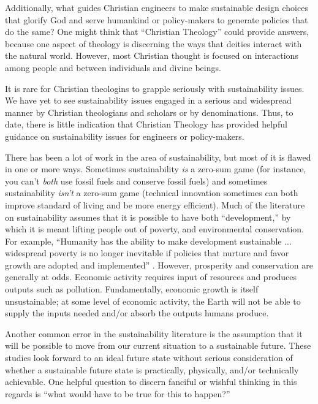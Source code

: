 \documentclass[12pt]{article}
\begin{document}
Additionally, what guides Christian engineers to make sustainable design choices
that glorify God and serve humankind
or policy-makers to generate policies that do the same?
One might think that ``Christian Theology'' could provide answers, because
one aspect of theology is discerning the 
ways that deities interact with the natural world. 
However, most Christian thought is focused on interactions among people 
and between individuals and divine beings.

It is rare for Christian theologins to grapple seriously with 
sustainability issues.
We have yet to see sustainability issues engaged in a serious and widespread manner
by Christian theologians and scholars or by denominations.
Thus, to date, there is little indication that Christian Theology 
has provided helpful guidance on sustainability issues
for engineers or policy-makers.


There has been a lot of work in the area of sustainability, but most of it is flawed in one or more ways.
Sometimes sustainability \emph{is} a zero-sum game 
(for instance, you can't \emph{both} use fossil fuels and conserve fossil fuels)
and sometimes sustainability \emph{isn't} a zero-sum game 
(technical innovation sometimes can both improve standard of living and be more energy efficient).
Much of the literature on sustainability assumes that it is possible to have both ``development,'' by which it is meant lifting people out of poverty,
and environmental conservation. 
For example, ``Humanity has the ability to make development sustainable ... widespread poverty is no
longer inevitable if policies that nurture and favor growth are adopted and implemented'' \cite{Ngome2015}.
However, prosperity and conservation are generally at odds. Economic activity requires input of resources
and produces outputs such as pollution. Fundamentally, economic growth is itself unsustainable; at some level of economic activity,
the Earth will not be able to supply the inputs needed and/or absorb the outputs humans produce.

Another common error in the sustainability literature is the assumption that it will be possible to move 
from our current situation to a sustainable future. These studies look forward to an ideal future state without
serious consideration of whether a sustainable future state is practically, physically, and/or technically achievable. 
One helpful question to discern fanciful or wishful thinking in this regards is ``what would have to be true for this to happen?''
\end{document}
